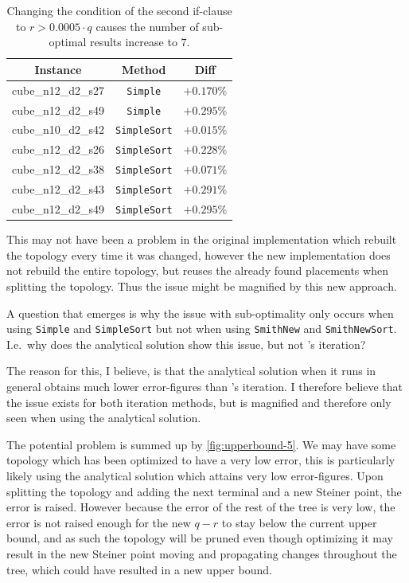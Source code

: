 \begin{table}[htbp]
  \centering
  \begin{tabular}{ccc}
    \toprule
    Instance           & Method              & Diff       \\
    \midrule
    cube\_n12\_d2\_s27 & \texttt{Simple}     & $+0.170\%$ \\
    cube\_n12\_d2\_s49 & \texttt{Simple}     & $+0.295\%$ \\
    cube\_n10\_d2\_s42 & \texttt{SimpleSort} & $+0.015\%$ \\
    cube\_n12\_d2\_s26 & \texttt{SimpleSort} & $+0.228\%$ \\
    cube\_n12\_d2\_s38 & \texttt{SimpleSort} & $+0.071\%$ \\
    cube\_n12\_d2\_s43 & \texttt{SimpleSort} & $+0.291\%$ \\
    cube\_n12\_d2\_s49 & \texttt{SimpleSort} & $+0.295\%$ \\
    \bottomrule
  \end{tabular}
  \caption[Sub-optimal results with condition $r > 0.0005 \cdot q$]{Changing
    the condition of the second if-clause to $r > 0.0005 \cdot q$ causes the
    number of sub-optimal results increase to $7$.\label{tab:correctness-errors-2}}
\end{table}

This may not have been a problem in the original implementation which rebuilt the
topology every time it was changed, however the new implementation does not
rebuild the entire topology, but reuses the already found placements when
splitting the topology. Thus the issue might be magnified by this new approach. 

A question that emerges is why the issue with sub-optimality only occurs when
using \texttt{Simple} and \texttt{SimpleSort} but not when using \texttt{SmithNew} and
\texttt{SmithNewSort}. I.e.\ why does the analytical solution show this issue,
but not \citeauthor{smith1992}'s iteration?

The reason for this, I believe, is that the analytical solution when it runs in
general obtains much lower error-figures than \citeauthor{smith1992}'s
iteration. I therefore believe that the issue exists for both iteration methods,
but is magnified and therefore only seen when using the analytical solution.

The potential problem is summed up by \cref{fig:upperbound-5}. We may have some
topology which has been optimized to have a very low error, this is particularly
likely using the analytical solution which attains very low error-figures. Upon
splitting the topology and adding the next terminal and a new Steiner point, the
error is raised. However because the error of the rest of the tree is very low,
the error is not raised enough for the new $q-r$ to stay below the current
upper bound, and as such the topology will be pruned even though optimizing it
may result in the new Steiner point moving and propagating changes throughout
the tree, which could have resulted in a new upper bound.

